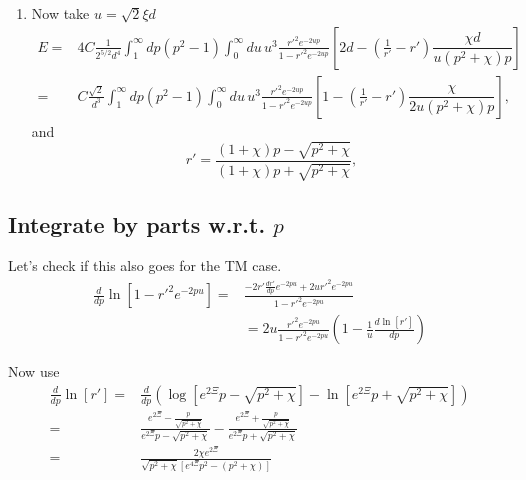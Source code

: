 \begin{enumerate}
\item Now take $u = \sqrt{2}\xi d$ 
 \begin{align}
E=&  4C\frac{1}{2^{5/2}d^4}\int_1^\infty dp (p^2-1)\int_0^\infty du\,u^{3} 
\frac{r'^2e^{-2u p}}{1-r'^2e^{-2u p}}\left[2d- \left(\frac{1}{r'}-r'\right)\dfrac{\chi d}{u(p^2+\chi)p}\right]\\
=&  C\frac{\sqrt{2}}{d^3}\int_1^\infty dp (p^2-1)\int_0^\infty du\,u^{3} 
 \frac{r'^2e^{-2u p}}{1-r'^2e^{-2u p}}\left[1- \left(\frac{1}{r'}-r'\right)\dfrac{\chi }{2u(p^2+\chi)p}\right],
\end{align}
and 
\begin{equation}
r' =  \frac{(1+\chi)p-\sqrt{p^2 + \chi}}{(1+ \chi)p+\sqrt{p^2+\chi}},
\end{equation}
\end{enumerate}

\subsection{Integrate by parts w.r.t. $p$}
Let's check if this also goes for the TM case.  
\begin{align}
\frac{d}{dp}\ln[1-r'^2 e^{-2pu}] =& \frac{-2r' \frac{dr'}{dp} e^{-2pu} + 2u r'^2 e^{-2pu}}{1-r'^2 e^{-2pu}} \\
&= 2u\frac{r'^2 e^{-2pu}}{1-r'^2 e^{-2pu}}\left( 1 -\frac{1}{u} \frac{d\ln[r']}{dp}\right)
\end{align}

Now use 
\begin{align}
\frac{d}{dp}\ln[r'] =& \frac{d}{dp}\left(\log[e^{2\Xi}p - \sqrt{p^2+\chi}] -\ln[e^{2\Xi}p + \sqrt{p^2+\chi}]\right) \\
=& \frac{e^{2\Xi} - \frac{p}{\sqrt{p^2+\chi}}}{e^{2\Xi}p-\sqrt{p^2+\chi}} -\frac{e^{2\Xi} + \frac{p}{\sqrt{p^2+\chi}}}{e^{2\Xi}p + \sqrt{p^2+\chi}}\\ 
=& \frac{2\chi e^{2\Xi}}{\sqrt{p^2+\chi}[e^{4\Xi}p^2-(p^2+\chi)]}\label{eq:TM_integration_by_parts}
\end{align}


